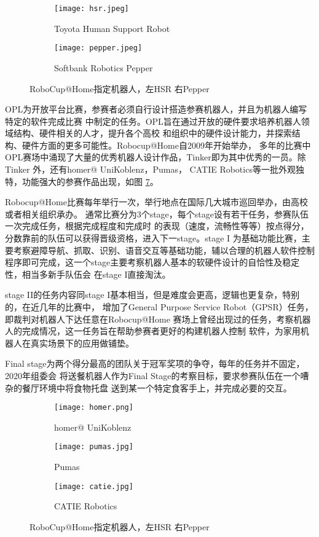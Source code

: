 \begin{figure}
\centering
\begin{subfigure}{.5\textwidth}
  \centering
  \texttt{[image: hsr.jpeg]}
  \caption{Toyota Human Support Robot}
  \label{fig:hsr}
\end{subfigure}%
\begin{subfigure}{.5\textwidth}
  \centering
  \texttt{[image: pepper.jpeg]}
  \caption{Softbank Robotics Pepper}
  \label{fig:pepper}
\end{subfigure}
\caption{RoboCup@Home指定机器人，左HSR 右Pepper}
\label{fig:hsr_pepper}
\end{figure}

OPL为开放平台比赛，参赛者必须自行设计搭造参赛机器人，并且为机器人编写特定的软件完成比赛
中制定的任务。OPL旨在通过开放的硬件要求培养机器人领域结构、硬件相关的人才，提升各个高校
和组织中的硬件设计能力，并探索结构、硬件方面的更多可能性。Robocup@Home自2009年开始举办，
多年的比赛中OPL赛场中涌现了大量的优秀机器人设计作品，Tinker即为其中优秀的一员。除Tinker
外，还有homer@ UniKoblenz\cite{memmesheimer2017homer}，Pumas\cite{savage2013pumas}，
CATIE Robotics\cite{fabre2018catie}等一批外观独特，功能强大的参赛作品出现，如图
\ref{fig:other_teams}。

Robocup@Home比赛每年举行一次，举行地点在国际几大城市巡回举办，由高校或者相关组织承办。
通常比赛分为3个stage，每个stage设有若干任务，参赛队伍一次完成任务，根据完成程度和完成时
的表现（速度，流畅性等等）按点得分，分数靠前的队伍可以获得晋级资格，进入下一stage。stage I
为基础功能比赛，主要考察避障导航、抓取、识别、语音交互等基础功能，辅以合理的机器人软件控制
程序即可完成，这一个stage主要考察机器人基本的软硬件设计的自恰性及稳定性，相当多新手队伍会
在stage I直接淘汰。

stage II的任务内容同stage I基本相当，但是难度会更高，逻辑也更复杂，特别的，在近几年的比赛中，
增加了General Purpose Service Robot（GPSR）任务，即裁判对机器人下达任意在Robocup@Home
赛场上曾经出现过的任务，考察机器人的完成情况，这一任务旨在帮助参赛者更好的构建机器人控制
软件，为家用机器人在真实场景下的应用做铺垫。

Final stage为两个得分最高的团队关于冠军奖项的争夺，每年的任务并不固定，2020年组委会
将送餐机器人作为Final Stage的考察目标，要求参赛队伍在一个嘈杂的餐厅环境中将食物托盘
送到某一个特定食客手上，并完成必要的交互。

\begin{figure}
\centering
\begin{subfigure}{.5\textwidth}
  \centering
  \texttt{[image: homer.png]}
  \caption{homer@ UniKoblenz}
  \label{fig:homer}
\end{subfigure}%
\begin{subfigure}{.5\textwidth}
  \centering
  \texttt{[image: pumas.jpg]}
  \caption{Pumas}
  \label{fig:pumas}
\end{subfigure}
\begin{subfigure}{.5\textwidth}
  \centering
  \texttt{[image: catie.jpg]}
  \caption{CATIE Robotics}
  \label{fig:catie}
\end{subfigure}
\caption{RoboCup@Home指定机器人，左HSR 右Pepper}
\label{fig:other_teams}
\end{figure}


